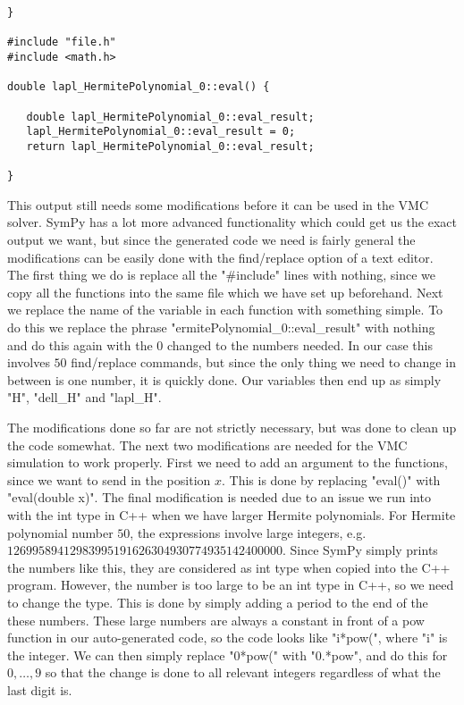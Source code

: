 \documentclass[../main.tex]{subfiles}
\begin{document}
\begin{appendices}
\begin{lstlisting}[caption={}, style=Bash]
}

#include "file.h"
#include <math.h>

double lapl_HermitePolynomial_0::eval() {

   double lapl_HermitePolynomial_0::eval_result;
   lapl_HermitePolynomial_0::eval_result = 0;
   return lapl_HermitePolynomial_0::eval_result;

}

\end{lstlisting}
This output still needs some modifications before it can be used in the VMC solver. SymPy has a lot more advanced functionality which could get us the exact output we want, but since the generated code we need is fairly general the modifications can be easily done with the find/replace option of a text editor. The first thing we do is replace all the "\#include" lines with nothing, since we copy all the functions into the same file which we have set up beforehand. Next we replace the name of the variable in each function with something simple. To do this we replace the phrase "ermitePolynomial\_0::eval\_result" with nothing and do this again with the $0$ changed to the numbers needed. In our case this involves $50$ find/replace commands, but since the only thing we need to change in between is one number, it is quickly done. Our variables then end up as simply "H", "dell\_H" and "lapl\_H".

The modifications done so far are not strictly necessary, but was done to clean up the code somewhat. The next two modifications are needed for the VMC simulation to work properly. First we need to add an argument to the functions, since we want to send in the position $x$. This is done by replacing "eval()" with "eval(double x)". The final modification is needed due to an issue we run into with the int type in C++ when we have larger Hermite polynomials. For Hermite polynomial number $50$, the expressions involve large integers, e.g. $12699589412983995191626304930774935142400000$. Since SymPy simply prints the numbers like this, they are considered as int type when copied into the C++ program. However, the number is too large to be an int type in C++, so we need to change the type. This is done by simply adding a period to the end of the these numbers. These large numbers are always a constant in front of a pow function in our auto-generated code, so the code looks like "i*pow(", where "i" is the integer. We can then simply replace "0*pow(" with "0.*pow", and do this for $0,\dots,9$ so that the change is done to all relevant integers regardless of what the last digit is.


\end{appendices}
\end{document}
